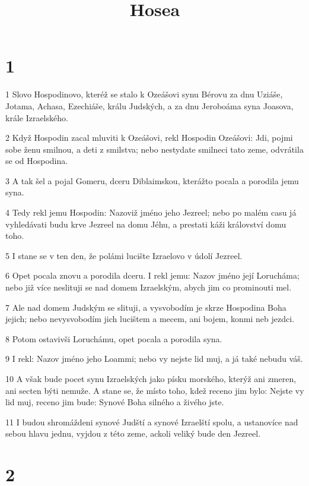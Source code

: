 

\title{Hosea}

\chapter{1}

\par 1 Slovo Hospodinovo, kteréž se stalo k Ozeášovi synu Bérovu za dnu Uziáše, Jotama, Achasa, Ezechiáše, králu Judských, a za dnu Jeroboáma syna Joasova, krále Izraelského.
\par 2 Když Hospodin zacal mluviti k Ozeášovi, rekl Hospodin Ozeášovi: Jdi, pojmi sobe ženu smilnou, a deti z smilstva; nebo nestydate smilneci tato zeme, odvrátila se od Hospodina.
\par 3 A tak šel a pojal Gomeru, dceru Diblaimskou, kterážto pocala a porodila jemu syna.
\par 4 Tedy rekl jemu Hospodin: Nazoviž jméno jeho Jezreel; nebo po malém casu já vyhledávati budu krve Jezreel na domu Jéhu, a prestati káži království domu toho.
\par 5 I stane se v ten den, že polámi lucište Izraelovo v údolí Jezreel.
\par 6 Opet pocala znovu a porodila dceru. I rekl jemu: Nazov jméno její Lorucháma; nebo již více neslituji se nad domem Izraelským, abych jim co prominouti mel.
\par 7 Ale nad domem Judským se slituji, a vysvobodím je skrze Hospodina Boha jejich; nebo nevysvobodím jich lucištem a mecem, ani bojem, konmi neb jezdci.
\par 8 Potom ostavivši Loruchámu, opet pocala a porodila syna.
\par 9 I rekl: Nazov jméno jeho Loammi; nebo vy nejste lid muj, a já také nebudu váš.
\par 10 A však bude pocet synu Izraelských jako písku morského, kterýž ani zmeren, ani secten býti nemuže. A stane se, že místo toho, kdež receno jim bylo: Nejste vy lid muj, receno jim bude: Synové Boha silného a živého jste.
\par 11 I budou shromáždeni synové Judští a synové Izraelští spolu, a ustanovíce nad sebou hlavu jednu, vyjdou z této zeme, ackoli veliký bude den Jezreel.

\chapter{2}


